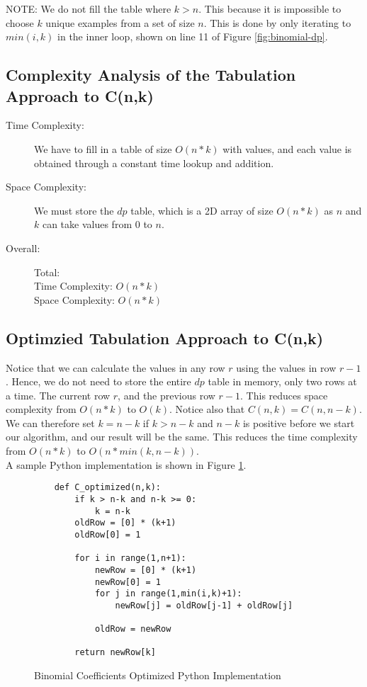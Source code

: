 NOTE: We do not fill the table where $k > n$.
This because it is impossible to choose $k$ unique examples from a set of size $n$.
This is done by only iterating to $min(i,k)$ in the inner loop, shown on line 11 of Figure \ref{fig:binomial-dp}.
\newpage

\subsection{Complexity Analysis of the Tabulation Approach to C(n,k)}

\begin{description}
    \item[Time Complexity:]
        We have to fill in a table of size $O(n * k)$ with values, and each value is obtained through a constant time lookup and addition.

    \item[Space Complexity:] 
        We must store the $dp$ table, which is a 2D array of size $O(n * k)$ as $n$ and $k$ can take values from $0$ to $n$.
        
    \item[Overall:] Total:\\
        Time Complexity: $O(n * k)$\\
        Space Complexity: $O(n * k)$
    
\end{description}

\subsection{Optimzied Tabulation Approach to C(n,k)}\label{subsec:binomial-coefficents-optimized}
Notice that we can calculate the values in any row $r$ using the values in row $r-1$.
Hence, we do not need to store the entire $dp$ table in memory, only two rows at a time.
The current row $r$, and the previous row $r-1$.
This reduces space complexity from $O(n * k)$ to $O(k)$.
Notice also that $C(n,k) = C(n,n-k)$.
We can therefore set $k = n-k$ if $k > n-k$ and $n-k$ is positive before we start our algorithm, and our result will be the same.
This reduces the time complexity from $O(n * k)$ to $O(n * min(k,n-k))$.\\

A sample Python implementation is shown in Figure \ref{fig:binomial-optimized}.

\begin{figure}[H]
    \centering
    \begin{lstlisting}
    def C_optimized(n,k):
        if k > n-k and n-k >= 0:
            k = n-k
        oldRow = [0] * (k+1)
        oldRow[0] = 1
    
        for i in range(1,n+1):
            newRow = [0] * (k+1)
            newRow[0] = 1
            for j in range(1,min(i,k)+1):
                newRow[j] = oldRow[j-1] + oldRow[j]
    
            oldRow = newRow
              
        return newRow[k]
    \end{lstlisting}
    \caption{Binomial Coefficients Optimized Python Implementation}
    \label{fig:binomial-optimized}
\end{figure}

